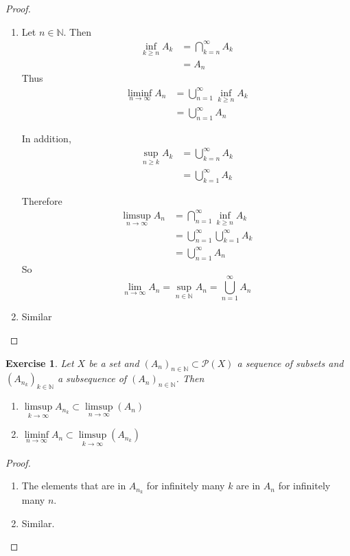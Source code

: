 \documentclass[12pt]{amsart}
\newtheorem{ex}[thm]{Exercise}
\newcommand{\N}{\mathbb{N}}
\newcommand{\MP}{\mathcal{P}}
\begin{document}
\begin{proof}\
\begin{enumerate}
\item Let $n \in \N$. Then 
\begin{align*}
\inf\limits_{k \geq n}A_k 
&= \bigcap\limits_{k=n}^{\infty}A_k \\
&= A_n
\end{align*}
Thus 
\begin{align*}
\liminf\limits_{n \rightarrow \infty}A_n 
&= \bigcup\limits_{n=1}^{\infty} \inf\limits_{k \geq n}A_k \\
&= \bigcup\limits_{n=1}^{\infty} A_n 
\end{align*}  

In addition,  
\begin{align*}
\sup_{n \geq k} A_k 
&= \bigcup_{k=n}^{\infty}A_k \\
&= \bigcup_{k=1}^{\infty}A_k 
\end{align*}

Therefore 
\begin{align*}
\limsup\limits_{n \rightarrow \infty}A_n 
&= \bigcap\limits_{n=1}^{\infty} \inf\limits_{k \geq n}A_k \\
&= \bigcup\limits_{n=1}^{\infty} \bigcup_{k=1}^{\infty}A_k  \\
&= \bigcup_{n=1}^{\infty}A_n
\end{align*}
So $$\lim\limits_{n \rightarrow \infty} A_n = \sup_{n \in \N}A_n = \bigcup_{n =1}^{\infty}A_n$$

\item Similar
\end{enumerate}
\end{proof}

\begin{ex}
Let $X$ be a set and $(A_n)_{n \in \N} \subset \MP(X)$ a sequence of subsets and $(A_{n_k})_{k \in \N}$ a subsequence of $(A_n)_{n \in \N}$. Then 
\begin{enumerate}
\item $\limsup\limits_{k \rightarrow \infty}A_{n_k} \subset \limsup\limits_{n \rightarrow \infty}(A_{n})$
\item $\liminf \limits_{n \rightarrow \infty} A_{n} \subset \limsup\limits_{k \rightarrow \infty}(A_{n_k})$
\end{enumerate}
\end{ex}

\begin{proof}\
\begin{enumerate}
\item The elements that are in $A_{n_k}$ for infinitely many $k$ are in $A_n$ for infinitely many $n$.
\item Similar.
\end{enumerate}
\end{proof}
\end{document}
